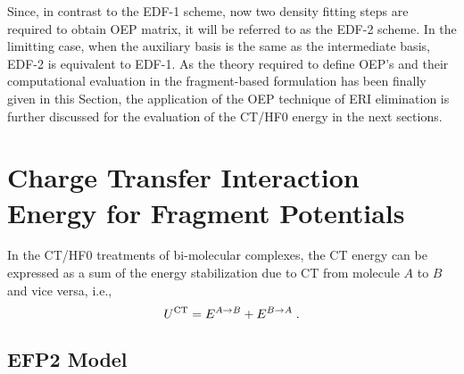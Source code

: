 Since, in contrast to the EDF-1 scheme, now two density fitting steps are required to
obtain OEP matrix, it will be referred to as the EDF-2 scheme.
In the limitting case, when the auxiliary basis is the same as the intermediate basis,
EDF-2 is equivalent to EDF-1.
As the theory required to define OEP's and their computational
evaluation in the fragment\hyp{}based formulation has been finally given in this Section,
the application of the OEP technique of ERI elimination is
further discussed for the evaluation of the CT/HF0 energy in the next sections.


\section{\label{s:3.ct}Charge Transfer Interaction Energy for Fragment Potentials}

In the CT/HF0 treatments of bi\hyp{}molecular complexes, the CT energy
can be expressed as a sum of the energy stabilization due to 
CT from molecule $A$ to $B$ and vice versa, i.e.,
%
\begin{equation} \label{e:ct-hf0}
 U^{\rm CT} =  E^{A\rightarrow B} + E^{B\rightarrow A}\;.
\end{equation}
%

\subsection{\label{ss:3.1.EFP2} EFP2 Model}

